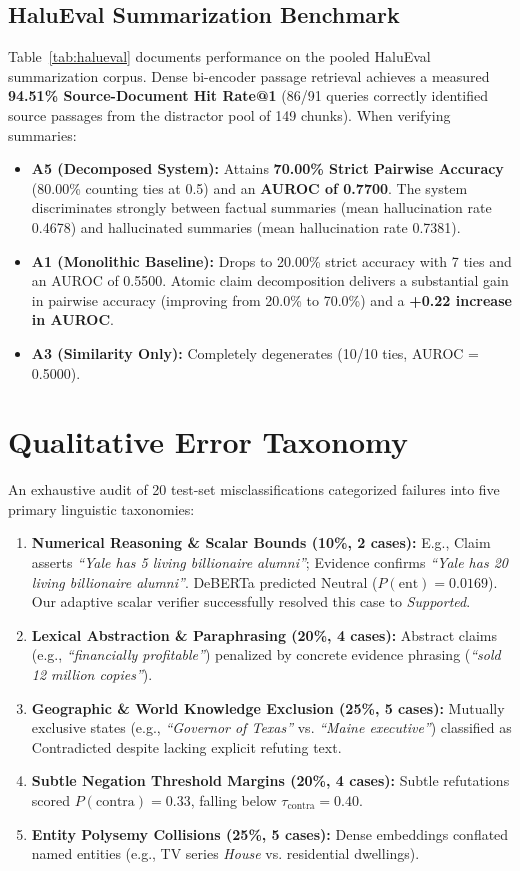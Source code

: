 \documentclass[conference]{IEEEtran}
\begin{document}
\subsection{HaluEval Summarization Benchmark}
Table~\ref{tab:halueval} documents performance on the pooled HaluEval summarization corpus.
Dense bi-encoder passage retrieval achieves a measured \textbf{94.51\% Source-Document Hit Rate@1} (86/91 queries correctly identified source passages from the distractor pool of 149 chunks).
When verifying summaries:
\begin{itemize}
    \item \textbf{A5 (Decomposed System):} Attains \textbf{70.00\% Strict Pairwise Accuracy} (80.00\% counting ties at 0.5) and an \textbf{AUROC of 0.7700}. The system discriminates strongly between factual summaries (mean hallucination rate 0.4678) and hallucinated summaries (mean hallucination rate 0.7381).
    \item \textbf{A1 (Monolithic Baseline):} Drops to 20.00\% strict accuracy with 7 ties and an AUROC of 0.5500. Atomic claim decomposition delivers a substantial gain in pairwise accuracy (improving from 20.0\% to 70.0\%) and a \textbf{+0.22 increase in AUROC}.
    \item \textbf{A3 (Similarity Only):} Completely degenerates (10/10 ties, AUROC = 0.5000).
\end{itemize}

\section{Qualitative Error Taxonomy}
An exhaustive audit of 20 test-set misclassifications categorized failures into five primary linguistic taxonomies:
\begin{enumerate}
    \item \textbf{Numerical Reasoning \& Scalar Bounds (10\%, 2 cases):} E.g., Claim asserts \textit{``Yale has 5 living billionaire alumni''}; Evidence confirms \textit{``Yale has 20 living billionaire alumni''}. DeBERTa predicted Neutral ($P(\text{ent}) = 0.0169$). Our adaptive scalar verifier successfully resolved this case to \textit{Supported}.
    \item \textbf{Lexical Abstraction \& Paraphrasing (20\%, 4 cases):} Abstract claims (e.g., \textit{``financially profitable''}) penalized by concrete evidence phrasing (\textit{``sold 12 million copies''}).
    \item \textbf{Geographic \& World Knowledge Exclusion (25\%, 5 cases):} Mutually exclusive states (e.g., \textit{``Governor of Texas''} vs. \textit{``Maine executive''}) classified as Contradicted despite lacking explicit refuting text.
    \item \textbf{Subtle Negation Threshold Margins (20\%, 4 cases):} Subtle refutations scored $P(\text{contra}) = 0.33$, falling below $\tau_{\text{contra}} = 0.40$.
    \item \textbf{Entity Polysemy Collisions (25\%, 5 cases):} Dense embeddings conflated named entities (e.g., TV series \textit{House} vs. residential dwellings).
\end{enumerate}
\end{document}
